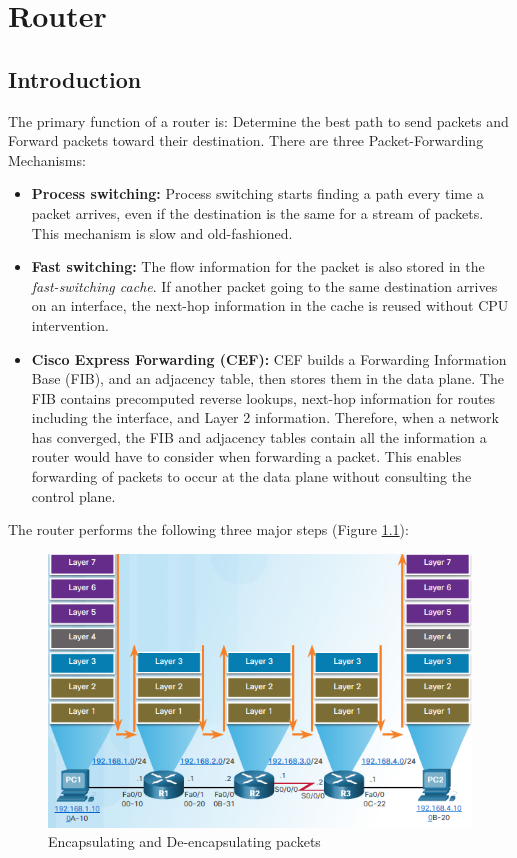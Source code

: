 \chapter{Router}

\section{Introduction}

The primary function of a router is: Determine the best path to send packets and Forward packets toward their destination. There are three Packet-Forwarding Mechanisms: 

\begin{itemize}
\item \textbf{Process switching:} Process switching starts finding a path every time a packet arrives, even if the destination is the same for a stream of packets. This mechanism is slow and old-fashioned.

\item \textbf{Fast switching:} The flow information for the packet is also stored in the \emph{fast-switching cache}. If another packet going to the same destination arrives on an interface, the next-hop information in the cache is reused without CPU intervention.

\item \textbf{Cisco Express Forwarding (CEF):} CEF builds a Forwarding Information Base (FIB), and an adjacency table, then stores them in the data plane. The FIB contains precomputed reverse lookups, next-hop information for routes including the interface, and Layer 2 information. Therefore, when a network has converged, the FIB and adjacency tables contain all the information a router would have to consider when forwarding a packet. This enables forwarding of packets to occur at the data plane without consulting the control plane.
\end{itemize}

The router performs the following three major steps (Figure \ref{SwitchingFunc}):

\begin{figure}[hbtp]
\caption{Encapsulating and De-encapsulating packets}\label{SwitchingFunc}
\centering
\includegraphics[scale=0.7]{pictures/SwitchingFunc.PNG}
\end{figure}


